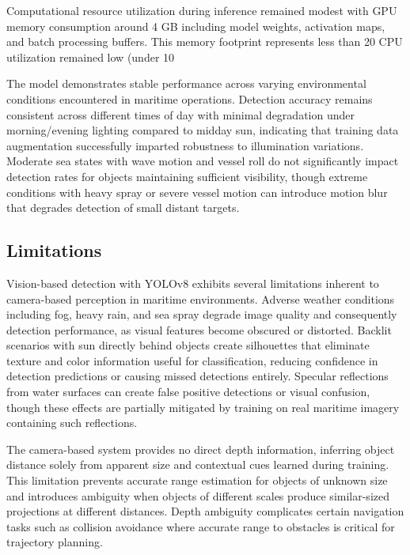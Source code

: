 Computational resource utilization during inference remained modest with GPU memory consumption around 4 GB including model weights, activation maps, and batch processing buffers.
This memory footprint represents less than 20%
CPU utilization remained low (under 10%

The model demonstrates stable performance across varying environmental conditions encountered in maritime operations.
Detection accuracy remains consistent across different times of day with minimal degradation under morning/evening lighting compared to midday sun, indicating that training data augmentation successfully imparted robustness to illumination variations.
Moderate sea states with wave motion and vessel roll do not significantly impact detection rates for objects maintaining sufficient visibility, though extreme conditions with heavy spray or severe vessel motion can introduce motion blur that degrades detection of small distant targets.

\subsection{Limitations} \label{sec:yolo_limitations}

Vision-based detection with YOLOv8 exhibits several limitations inherent to camera-based perception in maritime environments.
Adverse weather conditions including fog, heavy rain, and sea spray degrade image quality and consequently detection performance, as visual features become obscured or distorted.
Backlit scenarios with sun directly behind objects create silhouettes that eliminate texture and color information useful for classification, reducing confidence in detection predictions or causing missed detections entirely.
Specular reflections from water surfaces can create false positive detections or visual confusion, though these effects are partially mitigated by training on real maritime imagery containing such reflections.

The camera-based system provides no direct depth information, inferring object distance solely from apparent size and contextual cues learned during training.
This limitation prevents accurate range estimation for objects of unknown size and introduces ambiguity when objects of different scales produce similar-sized projections at different distances.
Depth ambiguity complicates certain navigation tasks such as collision avoidance where accurate range to obstacles is critical for trajectory planning.

